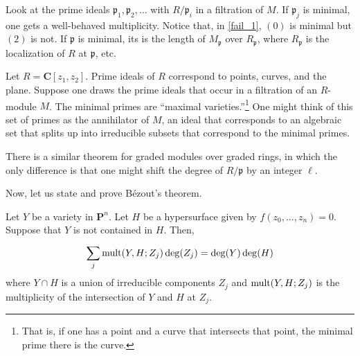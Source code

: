 \documentclass [11 pt, oneside] {article}
\begin{document}
Look at the prime ideals $\mathfrak{p}_1,\mathfrak{p}_2,\hdots$ with $R/\mathfrak{p}_i$ in a filtration of $M$. If $\mathfrak{p}_j$ is minimal, one gets a well-behaved multiplicity. Notice that, in \cref{fail_1}, $(0)$ is minimal but $(2)$ is not. If $\mathfrak{p}$ is minimal, its  is the length of $M_{\mathfrak{p}}$ over $R_{\mathfrak{p}}$, where $R_{\mathfrak{p}}$ is the localization of $R$ at $\mathfrak{p}$, etc.

Let $R=\mathbf{C}[z_1,z_2]$. Prime ideals of $R$ correspond to points, curves, and the plane. Suppose one draws the prime ideals that occur in a filtration of an $R$-module $M$. The minimal primes are ``maximal varieties.''\footnote{That is, if one has a point and a curve that intersects that point, the minimal prime there is the curve.} One might think of this set of primes as the annihilator of $M$, an ideal that corresponds to an algebraic set that splits up into irreducible subsets that correspond to the minimal primes.

There is a similar theorem for graded modules over graded rings, in which the only difference is that one might shift the degree of $R/\mathfrak{p}$ by an integer $\ell$. 

Now, let us state and prove B\'ezout's theorem.

\begin{theorem}[B\'ezout]\label{b_3}\text{}
Let $Y$ be a variety in $\mathbf{P}^n$. Let $H$ be a hypersurface given by $f(z_0,\hdots, z_n)=0$. Suppose that $Y$ is not contained in $H$. Then,
\begin{align*}
	\sum_{j}^{} \operatorname{mult}(Y, H; Z_j) \deg (Z_j) = \deg  (Y)\deg (H)
\end{align*}
where $Y\cap H$ is a union of irreducible components $Z_j$ and $\operatorname{mult}(Y,H;Z_j)$ is the multiplicity of the intersection of $Y$ and $H$ at $Z_j$.
\end{theorem}
\end{document}
